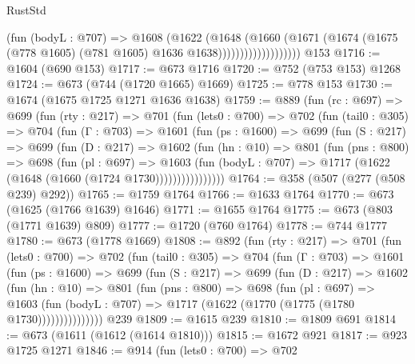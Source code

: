\begin{lexlean}{RustStd}
\begin{coremodule}
                            (fun (bodyL : @707) =>
                            @1608
                              (@1622
                                (@1648
                                  (@1660
                                    (@1671
                                      (@1674
                                        (@1675
                                          (@778 @1605)
                                          (@781 @1605)
                                          @1636
                                          @1638)))))))))))))))))))
    @153
@1716 := @1604 (@690 @153)
@1717 := @673 @1716
@1720 := @752 (@753 @153) @1268
@1724 := @673 (@744 (@1720 @1665) @1669)
@1725 := @778 @153
@1730 := @1674 (@1675 @1725 @1271 @1636 @1638)
@1759 := @889
    (fun (rc : @697) =>
    @699
      (fun (rty : @217) =>
      @701
        (fun (lets0 : @700) =>
        @702
          (fun (tail0 : @305) =>
          @704
            (fun (Γ : @703) =>
            @1601
              (fun (ps : @1600) =>
              @699
                (fun (S : @217) =>
                @699
                  (fun (D : @217) =>
                  @1602
                    (fun (hn : @10) =>
                    @801
                      (fun (pns : @800) =>
                      @698
                        (fun (pl : @697) =>
                        @1603
                          (fun (bodyL : @707) =>
                          @1717 (@1622 (@1648 (@1660 (@1724 @1730))))))))))))))))
@1764 := @358 (@507 (@277 (@508 @239) @292))
@1765 := @1759 @1764
@1766 := @1633 @1764
@1770 := @673 (@1625 (@1766 @1639) @1646)
@1771 := @1655 @1764
@1775 := @673 (@803 (@1771 @1639) @809)
@1777 := @1720 (@760 @1764)
@1778 := @744 @1777
@1780 := @673 (@1778 @1669)
@1808 := @892
    (fun (rty : @217) =>
    @701
      (fun (lets0 : @700) =>
      @702
        (fun (tail0 : @305) =>
        @704
          (fun (Γ : @703) =>
          @1601
            (fun (ps : @1600) =>
            @699
              (fun (S : @217) =>
              @699
                (fun (D : @217) =>
                @1602
                  (fun (hn : @10) =>
                  @801
                    (fun (pns : @800) =>
                    @698
                      (fun (pl : @697) =>
                      @1603
                        (fun (bodyL : @707) =>
                        @1717 (@1622 (@1770 (@1775 (@1780 @1730)))))))))))))))
    @239
@1809 := @1615 @239
@1810 := @1809 @691
@1814 := @673 (@1611 (@1612 (@1614 @1810)))
@1815 := @1672 @921
@1817 := @923 @1725 @1271
@1846 := @914
    (fun (lets0 : @700) =>
    @702

\end{coremodule}
\end{lexlean}
